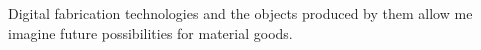 Digital fabrication technologies and the objects produced by them allow me imagine future possibilities for material goods.